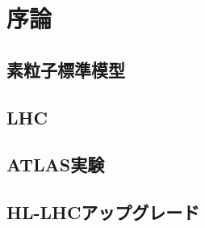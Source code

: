 \chapter{序論}


\section{素粒子標準模型}

\section{LHC}


\section{ATLAS実験}



\section{HL-LHCアップグレード}



\newpage
